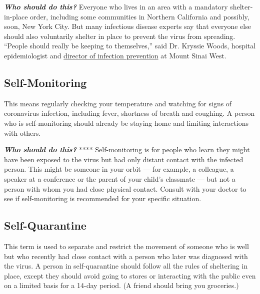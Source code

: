 \emph{\textbf{Who should do this?}} Everyone who lives in an area with a
mandatory shelter-in-place order, including some communities in Northern
California and possibly, soon, New York City. But many infectious
disease experts say that everyone else should also voluntarily shelter
in place to prevent the virus from spreading. ``People should really be
keeping to themselves,'' said Dr. Kryssie Woods, hospital epidemiologist
and \href{https://www.mountsinai.org/profiles/krystina-l-woods}{director
of infection prevention} at Mount Sinai West.

\hypertarget{self-monitoring}{%
\subsection{Self-Monitoring}\label{self-monitoring}}

This means regularly checking your temperature and watching for signs of
coronavirus infection, including fever, shortness of breath and
coughing. A person who is self-monitoring should already be staying home
and limiting interactions with others.

\emph{\textbf{Who should do this?}} **** Self-monitoring is for people
who learn they might have been exposed to the virus but had only distant
contact with the infected person. This might be someone in your orbit
--- for example, a colleague, a speaker at a conference or the parent of
your child's classmate --- but not a person with whom you had close
physical contact. Consult with your doctor to see if self-monitoring is
recommended for your specific situation.

\hypertarget{self-quarantine}{%
\subsection{Self-Quarantine}\label{self-quarantine}}

This term is used to separate and restrict the movement of someone who
is well but who recently had close contact with a person who later was
diagnosed with the virus. A person in self-quarantine should follow all
the rules of sheltering in place, except they should avoid going to
stores or interacting with the public even on a limited basis for a
14-day period. (A friend should bring you groceries.)

\href{https://www.nytimes3xbfgragh.onion/news-event/coronavirus?action=click\&pgtype=Article\&state=default\&region=MAIN_CONTENT_3\&context=storylines_faq}{}

